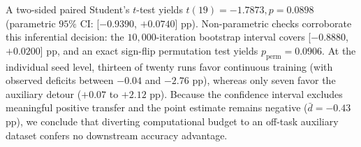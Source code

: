\documentclass[sn-mathphys,Numbered]{sn-jnl}
\begin{document}
\begin{table}[t]
\caption{Confirmatory inferential statistics for primary and secondary schedule contrasts across $N = 20$ paired seeds. Contrasts are expressed in percentage points (pp).}\label{tab:inferential_statistics}
\centering
\renewcommand{\arraystretch}{0.9}
\end{table}

A two-sided paired Student's $t$-test yields $t(19) = -1.7873, p = 0.0898$ (parametric $95\%$ CI: [$-0.9390$, $+0.0740$] pp). Non-parametric checks corroborate this inferential decision: the $10{,}000$-iteration bootstrap interval covers [$-0.8880$, $+0.0200$] pp, and an exact sign-flip permutation test yields $p_{\mathrm{perm}} = 0.0906$. At the individual seed level, thirteen of twenty runs favor continuous training (with observed deficits between $-0.04$ and $-2.76$ pp), whereas only seven favor the auxiliary detour ($+0.07$ to $+2.12$ pp). Because the confidence interval excludes meaningful positive transfer and the point estimate remains negative ($\bar{d} = -0.43$ pp), we conclude that diverting computational budget to an off-task auxiliary dataset confers no downstream accuracy advantage.
\end{document}
